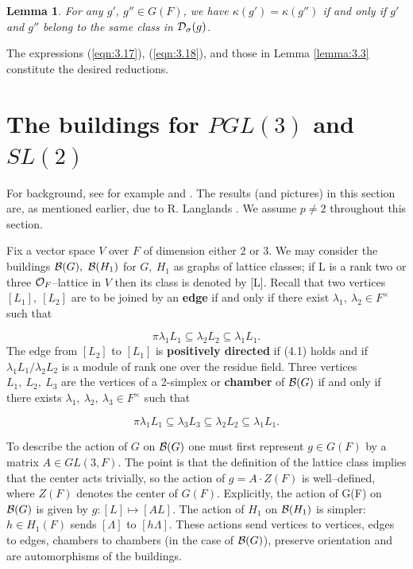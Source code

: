 \documentclass[12pt,letterpaper]{article}
\newtheorem{lemma}[theorem]{Lemma}
\def\ddd{{\cal D}}
\def\bbb{{\cal B}}
\def\off{{\cal O}_F}
\def\bbg{{\cal B}(G)}
\def\bbH1{{\cal B}(H_1)}
\def\sne{\subseteq}
\begin{document}
\begin{lemma}
\label{lemma:3.19}
For any $g',\ g'' \in G(F)$, we have
$\kappa (g')=\kappa (g'')$ if and only if $g'$ and $g''$ belong to the
same class in $\ddd_\sigma (g)$.
\end{lemma}
 
The expressions (\ref{eqn:3.17}), (\ref{eqn:3.18}), 
and those in Lemma \ref{lemma:3.3} constitute 
the desired reductions.


\section{The buildings for $PGL(3)$ and $SL(2)$}
\label{sec:4}

For background, see for example \cite{Ko1} and \cite{T}.
The results (and pictures) in this section are, as 
mentioned earlier, due to R. Langlands
\cite{La1}. We assume $p\not= 2$ throughout this section.
 
Fix a vector space $V$ over $F$ of dimension either 2 or 3.
We may consider the buildings $\bbb (G),\ \bbb (H_1)$ for $G,\ H_1$
as graphs of lattice classes; if L is a rank two or three $\off$--lattice
in $V$
then its class is denoted by [L]. Recall that two vertices $[L_1],\ [L_2]$
are to be joined by an {\bf edge} if and only if there exist 
$\lambda_1,\ \lambda_2 \in F^{\times}$ such that

\begin{equation}
\label{eqn:4.1}
\pi\lambda_1 L_1 \sne \lambda_2 L_2 \sne \lambda_1 L_1.
\end{equation}
The edge from $[L_2]$ to $[L_1]$ is {\bf positively directed} if (4.1)
holds and if $\lambda_1 L_1/\lambda_2 L_2$ is a module of rank one
over the residue field.
Three vertices $L_1,\ L_2,\ L_3$ are the vertices of a 2-simplex
or {\bf chamber} of $\bbb (G)$ if and only if there exists
$\lambda_1,\ \lambda_2,\ \lambda_3 \in F^{\times}$ such that

\begin{equation}
\label{eqn:4.2}
\pi\lambda_1 L_1 \sne \lambda_3L_3 
\sne \lambda_2 L_2 \sne \lambda_1 L_1.
\end{equation}
 
To describe the action of $G$ on
$\bbg$ one must first represent $g \in G(F)$ by a matrix
$A\in GL(3,F)$. The point is that the definition of the lattice class
implies that the center acts trivially, so the action of
$g = A\cdot Z(F)$ is well--defined, where $Z(F)$ denotes the
center of $G(F)$. Explicitly, the action of G(F) on $\bbg$ is given by
$g: [L] \longmapsto [AL].$
The action of $H_1$ on $\bbH1$ is simpler: $h\in H_1(F)$ sends
$[\Lambda ]$ to $[h\Lambda ]$. These actions send vertices to vertices, 
edges to edges, chambers to chambers
(in the case of $\bbg$), preserve orientation and are
automorphisms of the buildings. 
 
\end{document}
